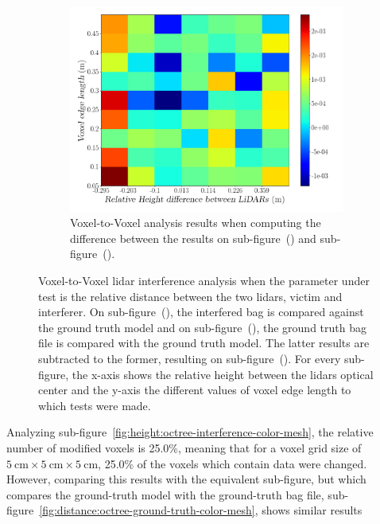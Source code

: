 \begin{figure}[!ht]
\begin{subfigure}[c]{0.45\textwidth}
	\label{fig:height:octree-ground-truth-color-mesh}
\end{subfigure}
\\ \vspace{4mm}
\begin{subfigure}[c]{0.8\textwidth}
	\includegraphics[width=\textwidth]{img/lidar-interference/height/octree_difference_color_mesh.png}
	\caption{Voxel-to-Voxel analysis results when computing the difference between the results on sub-figure~() and sub-figure~().}
	\label{fig:height:octree-difference-color-mesh}
\end{subfigure}

\caption{Voxel-to-Voxel \ac{lidar} interference analysis when the parameter under test is the relative distance between the two \acp{lidar}, victim and interferer. On sub-figure~(), the interfered bag is compared against the ground truth model and on sub-figure~(), the ground truth bag file is compared with the ground truth model. The latter results are subtracted to the former, resulting on sub-figure~(). For every sub-figure, the x-axis shows the relative height between the \acp{lidar} optical center and the y-axis the different values of voxel edge length to which tests were made.}
\label{fig:height:octree-color-mesh}
\end{figure}

Analyzing sub-figure~\ref{fig:height:octree-interference-color-mesh}, the relative number of modified voxels is 25.0\%, meaning that for a voxel grid size of $\SI{5}{\centi\meter}\times \SI{5}{\centi\meter}\times \SI{5}{\centi\meter}$, 25.0\% of the voxels which contain data were changed. However, comparing this results with the equivalent sub-figure, but which compares the ground-truth model with the ground-truth bag file, sub-figure~\ref{fig:distance:octree-ground-truth-color-mesh}, shows similar results

